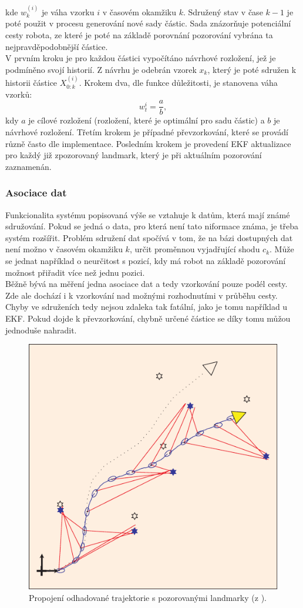 \documentclass[12pt]{report}
\begin{document}
kde $w^{(i)}_{k}$ je váha vzorku $i$ v časovém okamžiku $k$. Sdružený stav v čase $k-1$ je poté použit v procesu generování nové sady částic. Sada znázorňuje potenciální cesty robota, ze které je poté na základě porovnání pozorování vybrána ta nejpravděpodobnější částice.\\
\indent V prvním kroku je pro každou částici vypočítáno návrhové rozložení, jež je podmíněno svojí historií. Z návrhu je odebrán vzorek $x_k$, který je poté sdružen k historii částice $X^{(i)}_{0:k}$. Krokem dva, dle funkce důležitosti, je stanovena váha vzorků:
\begin{equation}
	w_t^i=\frac{a}{b},
\end{equation}
kdy $a$ je cílové rozložení (rozložení, které je optimální pro sadu částic) a $b$ je návrhové rozložení. Třetím krokem je případné převzorkování, které se provádí různě často dle implementace. Posledním krokem je provedení EKF aktualizace pro každý již zpozorovaný landmark, který je při aktuálním pozorování zaznamenán. \\

\subsubsection{Asociace dat}
Funkcionalita systému popisovaná výše se vztahuje k datům, která mají známé sdružování. Pokud se jedná o data, pro která není tato niformace známa, je třeba systém rozšířit. Problém sdružení dat spočívá v tom, že na bázi dostupných dat není možno v časovém okamžiku $k$, určit proměnnou vyjadřující shodu $c_k$. Může se jednat například o neurčitost s pozicí, kdy má robot na základě pozorování možnost přiřadit více než jednu pozici.\\
\indent Běžně bývá na měření jedna asociace dat a tedy vzorkování pouze podél cesty. Zde ale dochází i k vzorkování nad možnými rozhodnutími v průběhu cesty. Chyby ve sdruženích tedy nejsou zdaleka tak fatální, jako je tomu například u EKF. Pokud dojde k převzorkování, chybně určené částice se díky tomu můžou jednoduše nahradit.

\begin{figure}[!ht]
	\begin{center}
		\includegraphics[width=0.6\columnwidth]{imgs/RBPF_trajectory.pdf}
	\end{center}
	\caption{Propojení odhadované trajektorie s pozorovanými landmarky (z \cite{Durrant-Whyte2006}).}
	\label{fig:RBPF_trajectory}
\end{figure}
\end{document}
